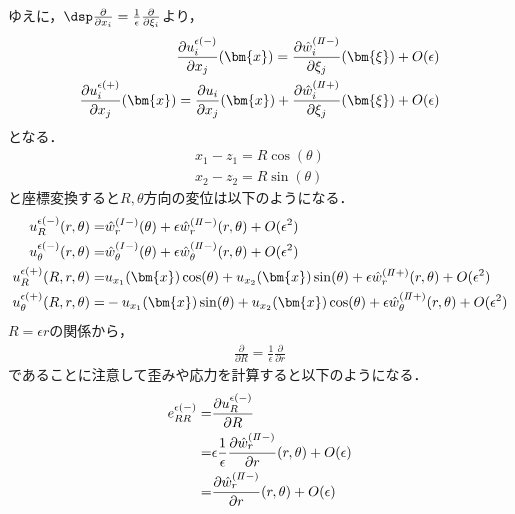 ゆえに，$\dsp\frac{\partial}{\partial x_{i}}=\frac{1}{\epsilon}\frac{\partial}{\partial \xi_{i}}$より，
\begin{align}
	\frac{\partial u_{i}^{\epsilon(-)}}{\partial x_{j}}(\bm{x})=
		\frac{\partial\hat{w}_{i}^{(I\hspace{-.15em}I-)}}{\partial \xi_{j}}(\bm{\xi})+O(\epsilon)
	\nonumber
	\\
	\frac{\partial u_{i}^{\epsilon(+)}}{\partial x_{j}}(\bm{x})
	=\frac{\partial u_{i}}{\partial x_{j}}(\bm{x})
		+\frac{\partial\hat{w}_{i}^{(I\hspace{-.15em}I+)}}{\partial \xi_{j}}(\bm{\xi})+O(\epsilon)
\end{align}
となる．
\begin{align}
	x_{1}-z_{1}=R\cos(\theta)
	\nonumber
	\\
	x_{2}-z_{2}=R\sin(\theta)
	\label{eq:xyToRTh}
\end{align}
と座標変換すると$R,\theta$方向の変位は以下のようになる．
\begin{align}
	u_{R}^{\epsilon(-)}(r,\theta)=&\hat{w}_{r}^{(I-)}(\theta)
	+\epsilon\hat{w}_{r}^{(I\hspace{-.15em}I-)}(r,\theta)+O(\epsilon^2)
	\nonumber
	\\
	u_{\theta}^{\epsilon(-)}(r,\theta)=&\hat{w}_{\theta}^{(I-)}(\theta)
	+\epsilon\hat{w}_{\theta}^{(I\hspace{-.15em}I-)}(r,\theta)+O(\epsilon^2)
	\nonumber
	\\
	u_{R}^{\epsilon(+)}(R,r,\theta)=&u_{x_{1}}(\bm{x})\cos(\theta)+u_{x_{2}}(\bm{x})\sin(\theta)
	+\epsilon\hat{w}_{r}^{(I\hspace{-.15em}I+)}(r,\theta)+O(\epsilon^2)
	\nonumber
	\\
	u_{\theta}^{\epsilon(+)}(R,r,\theta)=&-u_{x_{1}}(\bm{x})\sin(\theta)+u_{x_{2}}(\bm{x})\cos(\theta)
	+\epsilon\hat{w}_{\theta}^{(I\hspace{-.15em}I+)}(r,\theta)+O(\epsilon^2)
	\label{eq:SDForTD}
\end{align}
$R=\epsilon r$の関係から，
\begin{align}
	\frac{\partial}{\partial R}=\frac{1}{\epsilon}\frac{\partial}{\partial r}
	\label{eq:RTor}
\end{align}
であることに注意して歪みや応力を計算すると以下のようになる．
\begin{align}
	e_{RR}^{\epsilon(-)}
		=&\frac{\partial u_{R}^{\epsilon(-)}}{\partial R}
		\nonumber
		\\
		=&\epsilon\frac{1}{\epsilon}\frac{\partial\hat{w}_{r}^{(I\hspace{-.15em}I-)}}{\partial r}(r,\theta)+O(\epsilon)
		\nonumber
		\\
		=&\frac{\partial\hat{w}_{r}^{(I\hspace{-.15em}I-)}}{\partial r}(r,\theta)+O(\epsilon)
		\label{eq:eRRInEps}
\end{align}
